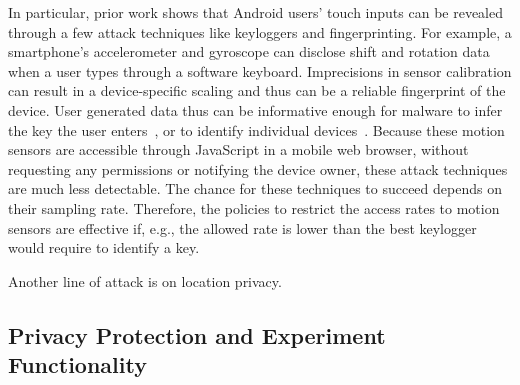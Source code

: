 In particular, prior work shows 
that Android users' touch inputs can be revealed through a few attack 
techniques like keyloggers and fingerprinting. For example, a smartphone's accelerometer 
and gyroscope can disclose shift and rotation data when a user types 
through a software keyboard. Imprecisions in sensor calibration can 
result in a device-specific scaling and thus can be a reliable fingerprint 
of the device. User generated data thus can be informative enough 
for malware to infer the key the user enters~\cite{cai2011touchlogger, 
owusu2012accessory}, or to identify individual devices~\cite{bojinov2014mobile, 
dey2014accelprint}. Because these motion sensors are accessible 
through JavaScript in a mobile web browser, without requesting any 
permissions or notifying the device owner, these attack techniques are much 
less detectable. The chance for these techniques to succeed
depends on their sampling rate. 
Therefore, the policies to restrict the access rates to motion sensors 
are effective if, e.g., the allowed rate is lower than the best keylogger 
would require to identify a key.

Another line of attack is on location privacy. 


\subsection{Privacy Protection and Experiment Functionality}



%
%

